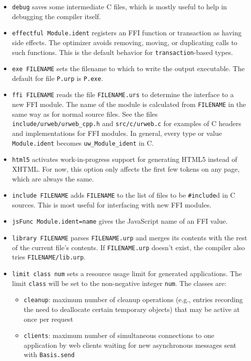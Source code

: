 \documentclass{article}
\begin{document}
\begin{itemize}
\item \texttt{debug} saves some intermediate C files, which is mostly useful to help in debugging the compiler itself.
\item \texttt{effectful Module.ident} registers an FFI function or transaction as having side effects.  The optimizer avoids removing, moving, or duplicating calls to such functions.  This is the default behavior for \texttt{transaction}-based types.
\item \texttt{exe FILENAME} sets the filename to which to write the output executable.  The default for file \texttt{P.urp} is \texttt{P.exe}.  
\item \texttt{ffi FILENAME} reads the file \texttt{FILENAME.urs} to determine the interface to a new FFI module.  The name of the module is calculated from \texttt{FILENAME} in the same way as for normal source files.  See the files \texttt{include/urweb/urweb\_cpp.h} and \texttt{src/c/urweb.c} for examples of C headers and implementations for FFI modules.  In general, every type or value \texttt{Module.ident} becomes \texttt{uw\_Module\_ident} in C.
\item \texttt{html5} activates work-in-progress support for generating HTML5 instead of XHTML.  For now, this option only affects the first few tokens on any page, which are always the same.
\item \texttt{include FILENAME} adds \texttt{FILENAME} to the list of files to be \texttt{\#include}d in C sources.  This is most useful for interfacing with new FFI modules.
\item \texttt{jsFunc Module.ident=name} gives the JavaScript name of an FFI value.
\item \texttt{library FILENAME} parses \texttt{FILENAME.urp} and merges its contents with the rest of the current file's contents.  If \texttt{FILENAME.urp} doesn't exist, the compiler also tries \texttt{FILENAME/lib.urp}.
\item \texttt{limit class num} sets a resource usage limit for generated applications.  The limit \texttt{class} will be set to the non-negative integer \texttt{num}.  The classes are:
  \begin{itemize}
  \item \texttt{cleanup}: maximum number of cleanup operations (e.g., entries recording the need to deallocate certain temporary objects) that may be active at once per request
  \item \texttt{clients}: maximum number of simultaneous connections to one application by web clients waiting for new asynchronous messages sent with \texttt{Basis.send}

\end{itemize}
\end{itemize}
\end{document}
